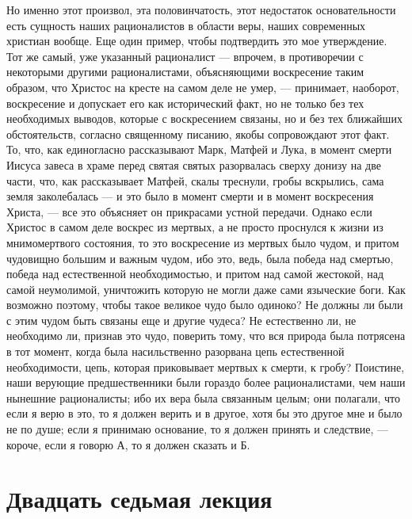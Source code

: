 \documentclass[12pt]{article}
\begin{document}
Но именно этот произвол, эта половинчатость, этот недостаток основательности есть сущность наших рационалистов в области веры, наших современных христиан вообще. Еще один пример, чтобы подтвердить это мое утверждение. Тот же самый, уже указанный рационалист --- впрочем, в противоречии с некоторыми другими рационалистами, объясняющими воскресение таким образом, что Христос на кресте на самом деле не умер, --- принимает, наоборот, воскресение и допускает его как исторический факт, но не только без тех необходимых выводов, которые с воскресением связаны, но и без тех ближайших обстоятельств, согласно священному писанию, якобы сопровождают этот факт. То, что, как единогласно рассказывают Марк, Матфей и Лука, в момент смерти Иисуса завеса в храме перед святая святых разорвалась сверху донизу на две части, что, как рассказывает Матфей, скалы треснули, гробы вскрылись, сама земля заколебалась --- и это было в момент смерти и в момент воскресения Христа, --- все это объясняет он прикрасами устной передачи. Однако если Христос в самом деле воскрес из мертвых, а не просто проснулся к жизни из мнимомертвого состояния, то это воскресение из мертвых было чудом, и притом чудовищно большим и важным чудом, ибо это, ведь, была победа над смертью, победа над естественной необходимостью, и притом над самой жестокой, над самой неумолимой, уничтожить которую не могли даже сами языческие боги. Как возможно поэтому, чтобы такое великое чудо было одиноко? Не должны ли были с этим чудом быть связаны еще и другие чудеса? Не естественно ли, не необходимо ли, признав это чудо, поверить тому, что вся природа была потрясена в тот момент, когда была насильственно разорвана цепь естественной необходимости, цепь, которая приковывает мертвых к смерти, к гробу? Поистине, наши верующие предшественники были гораздо более рационалистами, чем наши нынешние рационалисты; ибо их вера была связанным целым; они полагали, что если я верю в это, то я должен верить и в другое, хотя бы это другое мне и было не по душе; если я принимаю основание, то я должен принять и следствие, --- короче, если я говорю А, то я должен сказать и Б. 

{}
\section*{Двадцать седьмая лекция}
\end{document}
